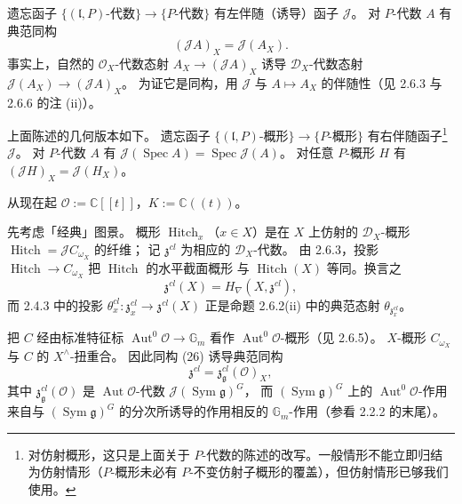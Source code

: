  遗忘函子 $\{(\mathfrak{l},P)\text{-代数}\}\to\{P\text{-代数}\}$
有左伴随（诱导）函子 $\mathcal{J}$。
对 $P$-代数 $A$ 有典范同构
\begin{equation}\tag{26}
(\mathcal{J}A)_X=\mathcal{J}(A_X).
\end{equation}
事实上，自然的 $\mathcal{O}_X$-代数态射 $A_X\to(\mathcal{J}A)_X$ 诱导
$\mathcal{D}_X$-代数态射 $\mathcal{J}(A_X)\to(\mathcal{J}A)_X$。
为证它是同构，用 $\mathcal{J}$ 与 $A\mapsto A_X$ 的伴随性（见 2.6.3 与 2.6.6 的注 (ii)）。

上面陈述的几何版本如下。
遗忘函子 $\{(\mathfrak{l},P)\text{-概形}\}\to\{P\text{-概形}\}$ 有右伴随函子\footnote{对仿射概形，这只是上面关于 $P$-代数的陈述的改写。一般情形不能立即归结为仿射情形（$P$-概形未必有 $P$-不变仿射子概形的覆盖），但仿射情形已够我们使用。} $\mathcal{J}$。
对 $P$-代数 $A$ 有 $\mathcal{J}(\operatorname{Spec} A)=\operatorname{Spec}\mathcal{J}(A)$。
对任意 $P$-概形 $H$ 有 $(\mathcal{J}H)_X=\mathcal{J}(H_X)$。

从现在起 $\mathcal{O}:=\mathbb{C}[[t]]$，$K:=\mathbb{C}((t))$。

 先考虑「经典」图景。
概形 $\operatorname{Hitch}_x$（$x\in X$）是在 $X$ 上仿射的 $\mathcal{D}_X$-概形
$\operatorname{Hitch}=\mathcal{J}C_{\omega_X}$ 的纤维；
记 $\mathfrak{z}^{cl}$ 为相应的 $\mathcal{D}_X$-代数。
由 2.6.3，投影 $\operatorname{Hitch}\to C_{\omega_X}$ 把 $\operatorname{Hitch}$ 的水平截面概形
与 $\operatorname{Hitch}(X)$ 等同。换言之
\[
\mathfrak{z}^{cl}(X)=H_\nabla(X,\mathfrak{z}^{cl}),
\]
而 2.4.3 中的投影 $\theta_x^{cl}: \mathfrak{z}_x^{cl}\to\mathfrak{z}^{cl}(X)$
正是命题 2.6.2(ii) 中的典范态射 $\theta_{\mathfrak{z}^{cl}_x}$。

把 $C$ 经由标准特征标 $\operatorname{Aut}^0\mathcal{O}\to\mathbb{G}_m$
看作 $\operatorname{Aut}^0\mathcal{O}$-概形（见 2.6.5）。
$X$-概形 $C_{\omega_X}$ 与 $C$ 的 $X^{\wedge}$-扭重合。
因此同构 (26) 诱导典范同构
\[
\mathfrak{z}^{cl}=\mathfrak{z}^{cl}_{\mathfrak{g}}(\mathcal{O})_X,
\]
其中 $\mathfrak{z}^{cl}_{\mathfrak{g}}(\mathcal{O})$ 是 $\operatorname{Aut}\mathcal{O}$-代数
$\mathcal{J}(\operatorname{Sym}\mathfrak{g})^G$，
而 $(\operatorname{Sym}\mathfrak{g})^G$ 上的 $\operatorname{Aut}^0\mathcal{O}$-作用
来自与 $(\operatorname{Sym}\mathfrak{g})^G$ 的分次所诱导的作用相反的 $\mathbb{G}_m$-作用（参看 2.2.2 的末尾）。

